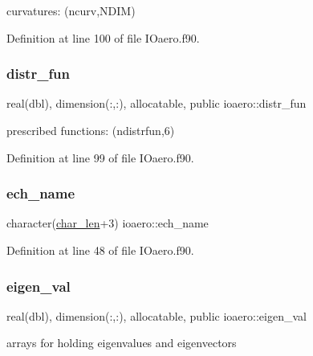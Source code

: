 curvatures\+: (ncurv,N\+D\+IM) 



Definition at line 100 of file I\+Oaero.\+f90.

\mbox{\label{namespaceioaero_a1d7c3689e30c2925cd403a84e9176242}} 
\subsubsection{\texorpdfstring{distr\+\_\+fun}{distr\_fun}}
{\footnotesize\ttfamily real(dbl), dimension(\+:,\+:), allocatable, public ioaero\+::distr\+\_\+fun}



prescribed functions\+: (ndistrfun,6) 



Definition at line 99 of file I\+Oaero.\+f90.

\mbox{\label{namespaceioaero_a175dde142a22987a0e59b9738444d2e3}} 
\subsubsection{\texorpdfstring{ech\+\_\+name}{ech\_name}}
{\footnotesize\ttfamily character(\hyperlink{namespaceioaero_acd6bdfdcfd986fd1c26261e5996e3b03}{char\+\_\+len}+3) ioaero\+::ech\+\_\+name\hspace{0.3cm}{\ttfamily [private]}}



Definition at line 48 of file I\+Oaero.\+f90.

\mbox{\label{namespaceioaero_ae043619051217506f070ece6f24deedf}} 
\subsubsection{\texorpdfstring{eigen\+\_\+val}{eigen\_val}}
{\footnotesize\ttfamily real(dbl), dimension(\+:,\+:), allocatable, public ioaero\+::eigen\+\_\+val}



arrays for holding eigenvalues and eigenvectors 




